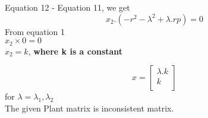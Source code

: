\documentclass[a4paper,10pt]{article}
\begin{document}
 Equation 12 - Equation 11, we get\\
 \[ x_2.(-r^2 - \lambda^2 + \lambda.rp) = 0 \]
 From equation 1\\
 $ x_2 \times 0 = 0$\\
 $ x_2 = k$, \bf{where k is a constant}
 
 \[x = 
   \left[
     \begin{array}{c}
       \lambda.k \\
       k \\
     \end{array}
   \right]
 \]
 for $\lambda = \lambda_1, \lambda_2$\\
 The given Plant matrix is inconsistent matrix.
\end{document}

